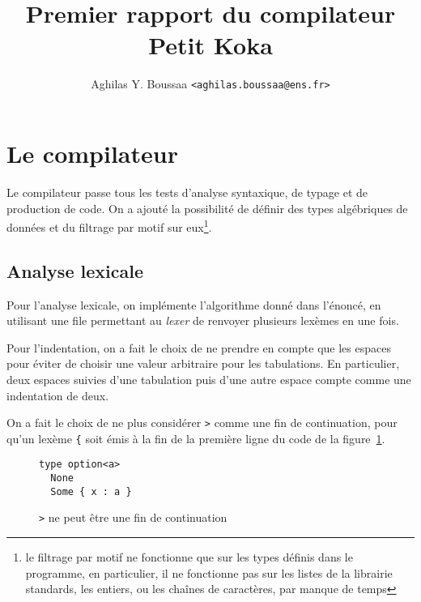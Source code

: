 \documentclass[11pt]{article}
\author{Aghilas Y. Boussaa \texttt{<aghilas.boussaa@ens.fr>}}
\title{Premier rapport du compilateur \textsf{Petit Koka}}
\begin{document}
\maketitle
\section{Le compilateur}
Le compilateur passe tous les tests d'analyse syntaxique, de typage et de
production de code. On a ajouté la possibilité de définir des types algébriques
de données et du filtrage par motif sur eux\footnote{le filtrage par motif ne
fonctionne que sur les types définis dans le programme, en particulier, il ne
fonctionne pas sur les listes de la librairie standards, les entiers, ou les
chaînes de caractères, par manque de temps}.

\subsection{Analyse lexicale}
Pour l'analyse lexicale, on implémente l'algorithme donné dans l'énoncé, en
utilisant une file permettant au \textit{lexer} de renvoyer plusieurs lexèmes en
une fois.

Pour l'indentation, on a fait le choix de ne prendre en compte que les espaces
pour éviter de choisir une valeur arbitraire pour les tabulations. En
particulier, deux espaces suivies d'une tabulation puis d'une autre espace
compte comme une indentation de deux.

On a fait le choix de ne plus considérer \texttt{>} comme une fin de
continuation, pour qu'un lexème \texttt{\{} soit émis à la fin de la première
ligne du code de la figure~\ref{rang}.
\begin{figure}[h]
\begin{verbatim}
type option<a>
  None
  Some { x : a }
\end{verbatim}
\caption{\texttt{>} ne peut être une fin de continuation}\label{rang}
\end{figure}
\end{document}
